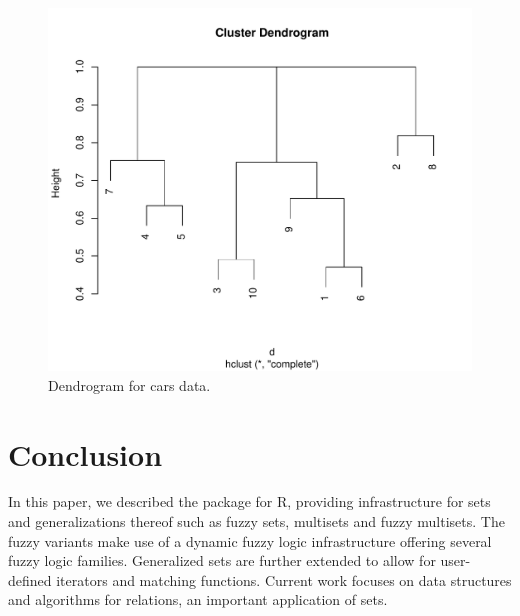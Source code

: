 \documentclass[article]{jss}
\newcommand\R{\textsf{R}}
\begin{document}
\begin{figure}[h]
\begin{center}
\includegraphics{JSS-clusterplot}
\caption{Dendrogram for cars data.}
\label{fig:cluster}
\end{center}
\end{figure}

\section{Conclusion}
\label{sec:conclusion}

In this paper, we described the  package for \R, providing
infrastructure for sets and generalizations thereof such as fuzzy
sets, multisets and fuzzy multisets. The fuzzy variants make use of a
dynamic fuzzy logic infrastructure offering several fuzzy logic
families. Generalized sets are further extended to allow for
user-defined iterators and matching functions. Current work focuses on
data structures and algorithms for relations,
an important application of sets.
\end{document}
